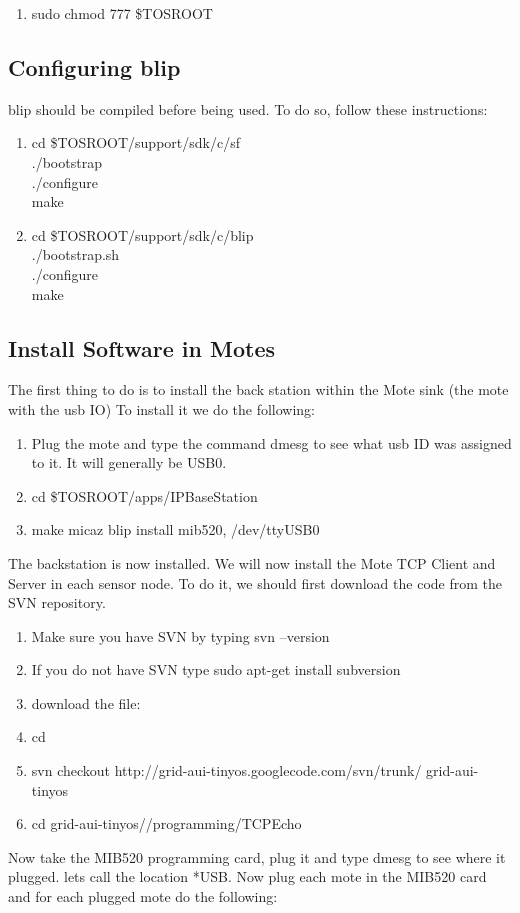 \documentclass[12pt,a4paper,final]{report}
\begin{document}
\begin{appendices}
\begin{enumerate}
\item sudo chmod 777 \$TOSROOT
\end{enumerate}

\subsection{Configuring \gls{blip}}
\gls{blip} should be compiled before being used. To do so, follow these instructions:
\begin{enumerate}
\item cd \$TOSROOT/support/sdk/c/sf \\
./bootstrap \\
./configure \\
make 
\item cd \$TOSROOT/support/sdk/c/blip \\
./bootstrap.sh \\
./configure \\
make 
\end{enumerate}

\subsection{Install Software in Motes}
The first thing to do is to install the back station within the Mote sink (the mote with the \gls{usb} IO) To install it we do the following:
\begin{enumerate}
\item Plug the mote and type the command dmesg to see what \gls{usb} ID was assigned to it. It will generally be USB0.
\item cd \$TOSROOT/apps/IPBaseStation
\item make micaz blip install  mib520, /dev/ttyUSB0
\end{enumerate}
The backstation is now installed. We will now install the Mote TCP Client and Server in each sensor node. To do it, we should first download the code from the SVN repository.
\begin{enumerate}
\item Make sure you have SVN by typing svn --version
\item If you do not have SVN type sudo apt-get install subversion
\item download the file:
\item cd
\item svn checkout http://grid-aui-tinyos.googlecode.com/svn/trunk/ grid-aui-tinyos
\item cd grid-aui-tinyos//programming/TCPEcho
\end{enumerate}
Now take the MIB520 programming card, plug it and type dmesg to see where it plugged. lets call the location *USB. Now plug each mote in the MIB520 card and for each plugged mote do the following:


\end{appendices}
\end{document}
